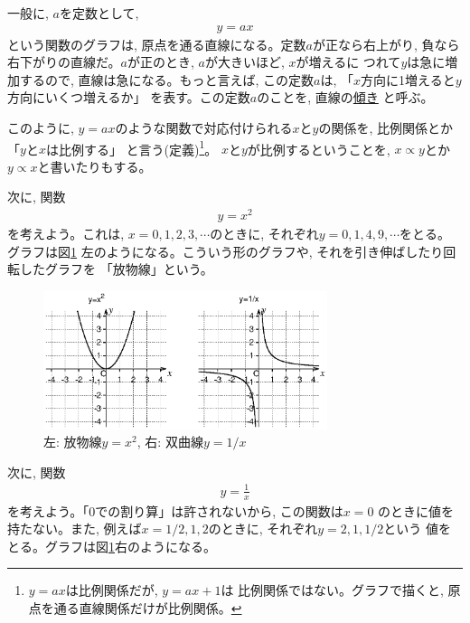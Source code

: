 一般に, $a$を定数として, 
\begin{eqnarray}y=ax\label{eq:ex_propfunc22}\end{eqnarray}
という関数のグラフは, 原点を通る直線になる。定数$a$が正なら右上がり, 
負なら右下がりの直線だ。$a$が正のとき, $a$が大きいほど, $x$が増えるに
つれて$y$は急に増加するので, 直線は急になる。もっと言えば, 
この定数$a$は, 「$x$方向に1増えると$y$方向にいくつ増えるか」
を表す。この定数$a$のことを, 直線の\underline{傾き} と呼ぶ。

このように, $y=ax$のような関数で対応付けられる$x$と$y$の関係を, 
比例関係とか「$y$と$x$は比例する」
と言う(定義)\footnote{$y=ax$は比例関係だが, $y=ax+1$は
比例関係ではない。グラフで描くと, 原点を通る直線関係だけが比例関係。}。
$x$と$y$が比例するということを, $x \propto y$とか$y \propto x$と書いたりもする。\hv

次に, 関数
\begin{eqnarray}y=x^2\label{eq:exxsq}\end{eqnarray}
を考えよう。これは, $x=0, 1, 2, 3, \cdots$のときに, 
それぞれ$y=0, 1, 4, 9, \cdots$をとる。グラフは図\ref{fig:parab_inverse}
左のようになる。こういう形のグラフや, それを引き伸ばしたり回転したグラフを
「放物線」という。


\begin{figure}[h]
    \centering
    \includegraphics[width=8.3cm]{parab_inverse.eps}
    \caption{左: 放物線$y=x^2$, 右: 双曲線$y=1/x$}\label{fig:parab_inverse}
\end{figure}

次に, 関数
\begin{eqnarray}y=\frac{1}{x}\label{eq:ex1ovsrx}\end{eqnarray}
を考えよう。「0での割り算」は許されないから, この関数は$x=0$
のときに値を持たない。また, 例えば$x=1/2, 1, 2$のときに, それぞれ$y=2, 1, 1/2$という
値をとる。グラフは図\ref{fig:parab_inverse}右のようになる。

